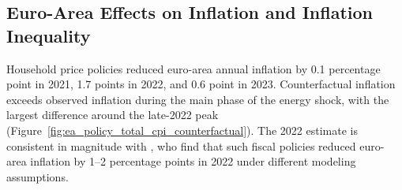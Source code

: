 \documentclass[11pt]{article}
\begin{document}








\subsection{Euro-Area Effects on Inflation and Inflation Inequality}
\label{sec:temporal-fiscal-effects}

Household price policies reduced euro-area annual inflation by 0.1 percentage point in 2021, 1.7
points in 2022, and 0.6 point in 2023. Counterfactual inflation exceeds observed inflation during
the main phase of the energy shock, with the largest difference around the late-2022 peak
(Figure~\ref{fig:ea_policy_total_cpi_counterfactual}). The 2022 estimate is
consistent in magnitude with \citet{dao2023unconventional}, who find that such fiscal policies
reduced euro-area inflation by 1--2 percentage points in 2022 under different
modeling assumptions.
\end{document}
